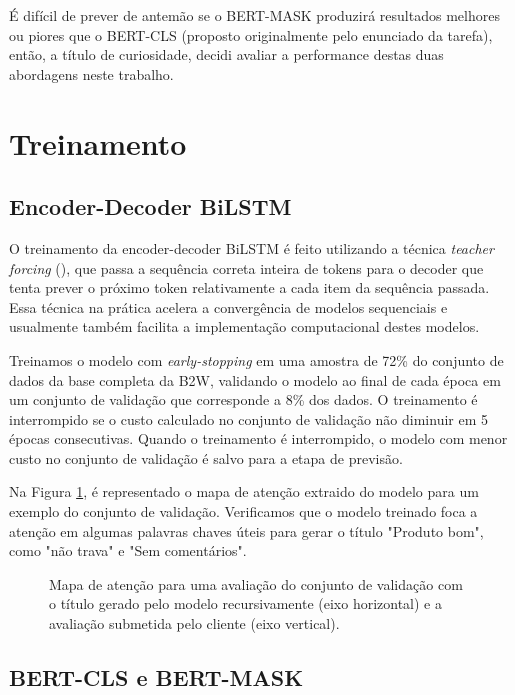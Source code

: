 \documentclass{article}
\begin{document}
É difícil de prever de antemão se o BERT-MASK produzirá resultados melhores ou piores que o BERT-CLS (proposto originalmente pelo enunciado da tarefa), então, a título de curiosidade, decidi avaliar a performance destas duas abordagens neste trabalho.

\section{Treinamento}

\subsection{Encoder-Decoder BiLSTM}

O treinamento da encoder-decoder BiLSTM é feito utilizando a técnica \textit{teacher forcing} (\textcite{williams1989learning}), que passa a sequência correta inteira de tokens para o decoder que tenta prever o próximo token relativamente a cada item da sequência passada. Essa técnica na prática acelera a convergência de modelos sequenciais e usualmente também facilita a implementação computacional destes modelos.

Treinamos o modelo com \textit{early-stopping} em uma amostra de 72\% do conjunto de dados da base completa da B2W, validando o modelo ao final de cada época em um conjunto de validação que corresponde a 8\% dos dados. O treinamento é interrompido se o custo calculado no conjunto de validação não diminuir em 5 épocas consecutivas. Quando o treinamento é interrompido, o modelo com menor custo no conjunto de validação é salvo para a etapa de previsão.

Na Figura \ref{att_map}, é representado o mapa de atenção extraido do modelo para um exemplo do conjunto de validação. Verificamos que o modelo treinado foca a atenção em algumas palavras chaves úteis para gerar o título "Produto bom", como "não trava" e "Sem comentários".

\begin{figure}[h!]
	\scalebox{0.73}{}
	\centering
	\caption{Mapa de atenção para uma avaliação do conjunto de validação com o título gerado pelo modelo recursivamente (eixo horizontal) e a avaliação submetida pelo cliente (eixo vertical).}
	\label{att_map}
\end{figure}

\subsection{BERT-CLS e BERT-MASK}
\end{document}
